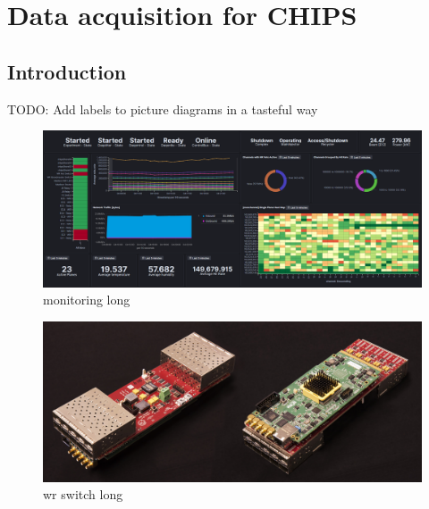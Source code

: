 \chapter{Data acquisition for CHIPS}
\label{chap:daq}

\section{Introduction}
\label{sec:daq_intro}

TODO: Add labels to picture diagrams in a tasteful way
\begin{figure} %
    \includegraphics[width=\textwidth]{diagrams/5-daq/monitoring.png}
    \caption[monitoring short]{monitoring long}
    \label{fig:monitoring}
\end{figure} %

\begin{figure} %
    \includegraphics[width=\textwidth]{diagrams/5-daq/wr_switch.jpg}
    \caption[wr switch short]{wr switch long}
    \label{fig:wr_switch}
\end{figure} %

